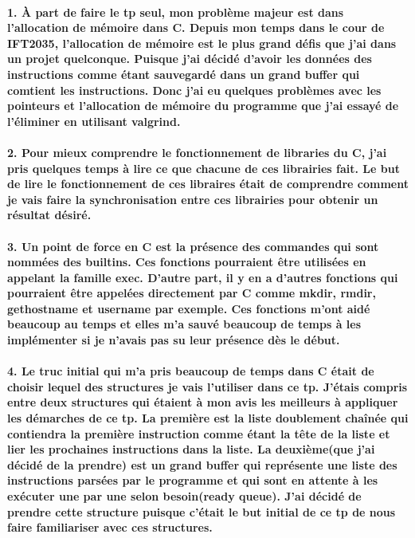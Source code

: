 \documentclass{article}
\begin{document}
\paragraph{1. À part de faire le tp seul, mon problème majeur est dans l'allocation de mémoire dans C. Depuis mon temps dans le cour de IFT2035, l'allocation de mémoire est le plus grand défis que j'ai dans un projet quelconque. Puisque j'ai décidé d'avoir les données des instructions comme étant sauvegardé dans un grand buffer qui comtient les instructions. Donc j'ai eu quelques problèmes avec les pointeurs et l'allocation de mémoire du programme que j'ai essayé de l'éliminer en utilisant valgrind.}

\paragraph{2. Pour mieux comprendre le fonctionnement de libraries du C, j'ai pris quelques temps à lire ce que chacune de ces librairies fait. Le but de lire le fonctionnement de ces libraires était de comprendre comment je vais faire la synchronisation entre ces librairies pour obtenir un résultat désiré.}

\paragraph{3. Un point de force en C est la présence des commandes qui sont nommées des builtins. Ces fonctions pourraient être utilisées en appelant la famille exec. D'autre part, il y en a d'autres fonctions qui pourraient être appelées directement par C comme mkdir, rmdir, gethostname et username par exemple. Ces fonctions m'ont aidé beaucoup au temps et elles m'a sauvé beaucoup de temps à les implémenter si je n'avais pas su leur présence dès le début.}

\paragraph{4. Le truc initial qui m'a pris beaucoup de temps dans C était de choisir lequel des structures je vais l'utiliser dans ce tp. J'étais compris entre deux structures qui étaient à mon avis les meilleurs à appliquer les démarches de ce tp. La première est la liste doublement chaînée qui contiendra la première instruction comme étant la tête de la liste et lier les prochaines instructions dans la liste. La deuxième(que j'ai décidé de la prendre) est un grand buffer qui représente une liste des instructions parsées par le programme et qui sont en attente à les exécuter une par une selon besoin(ready queue). J'ai décidé de prendre cette structure puisque c'était le but initial de ce tp de nous faire familiariser avec ces structures.}
\end{document}
